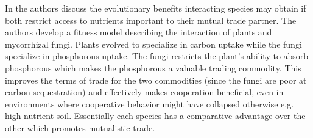 \documentclass[float=false, crop=false]{standalone}
\begin{document}
	In \cite{Wyatt2016} the authors discuss the evolutionary benefits interacting species may obtain if both restrict access to nutrients important to their mutual trade partner. The authors develop a fitness model describing the interaction of plants and mycorrhizal fungi. Plants evolved to specialize in carbon uptake while the fungi specialize in phosphorous uptake. The fungi restricts the plant's ability to absorb phosphorous which makes the phosphorous a valuable trading commodity. This improves the terms of trade for the two commodities (since the fungi are poor at carbon sequestration) and effectively makes cooperation beneficial, even in environments where cooperative behavior might have collapsed otherwise e.g. high nutrient soil. Essentially each species has a comparative advantage over the other which promotes mutualistic trade.  	

	\ifstandalone
			
		
	\fi
\end{document}
